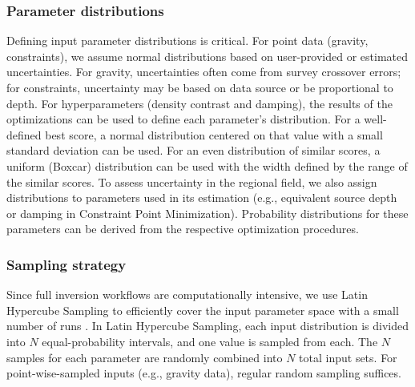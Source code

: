 \documentclass[tc, manuscript]{copernicus}
\begin{document}
\subsubsection{Parameter distributions}
Defining input parameter distributions is critical. For point data (gravity, constraints), we assume normal distributions based on user-provided or estimated uncertainties. For gravity, uncertainties often come from survey crossover errors; for constraints, uncertainty may be based on data source or be proportional to depth. For hyperparameters (density contrast and damping), the results of the optimizations can be used to define each parameter's distribution. For a well-defined best score, a normal distribution centered on that value with a small standard deviation can be used. For an even distribution of similar scores, a uniform (Boxcar) distribution can be used with the width defined by the range of the similar scores. To assess uncertainty in the regional field, we also assign distributions to parameters used in its estimation (e.g., equivalent source depth or damping in Constraint Point Minimization). Probability distributions for these parameters can be derived from the respective optimization procedures.

\subsubsection{Sampling strategy}
Since full inversion workflows are computationally intensive, we use Latin Hypercube Sampling to efficiently cover the input parameter space with a small number of runs \citep{jansenmonte1994, heltonsurvey2006}. In Latin Hypercube Sampling, each input distribution is divided into $N$ equal-probability intervals, and one value is sampled from each. The $N$ samples for each parameter are randomly combined into $N$ total input sets. For point-wise-sampled inputs (e.g., gravity data), regular random sampling suffices.
\end{document}
